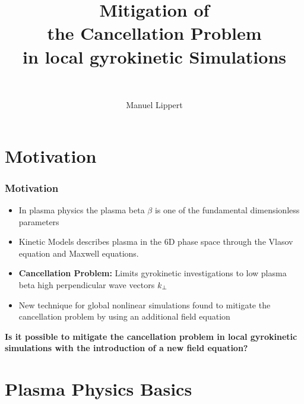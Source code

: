 \documentclass[compress,aspectratio=1610,noflama]{beamer}
\title{Mitigation of \\ the Cancellation Problem \\ in local gyrokinetic Simulations}
\subtitle{~}
\author{Manuel Lippert}
\institute{Theoretical Physics V}
\begin{document}
	\maketitle

	\section*{Motivation}
	\begin{frame}
		\frametitle{Motivation}

		\begin{center}
			\begin{itemize}
				\item <2-> In plasma physics the plasma beta $\beta$ is one of the fundamental dimensionless parameters
				\item <3-> Kinetic Models describes plasma in the 6D phase space through the Vlasov equation and Maxwell equations.
				\item <4-> \textbf{Cancellation Problem:} Limits gyrokinetic investigations to low plasma beta high perpendicular wave vectors $k_\perp$
				\item <5-> New technique for global nonlinear simulations found to mitigate the cancellation problem by using an additional field equation
			\end{itemize}
			\bigskip
			 \textbf{Is it possible to mitigate the cancellation problem in local gyrokinetic simulations with the introduction of a new field equation?}
		\end{center}
	\end{frame}

	\section*{Plasma Physics Basics}
\end{document}
